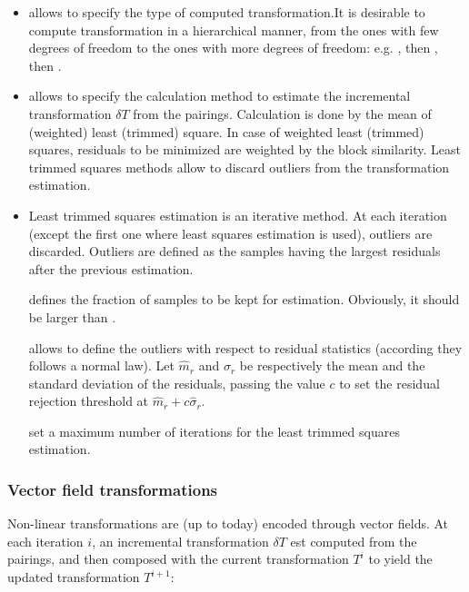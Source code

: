\begin{itemize}

\item[]  allows to specify the type of computed transformation.It is desirable to compute transformation in a hierarchical manner, from the ones with few degrees of freedom to the ones with more degrees of freedom: e.g. , then , then .

\item[]  allows to specify the calculation method to estimate the incremental transformation $\delta T$ from the pairings. Calculation is done by the mean of (weighted) least (trimmed) square. In case of weighted least (trimmed) squares, residuals to be minimized are weighted by the block similarity. Least trimmed squares methods allow to discard outliers from the transformation estimation.

\item[] Least trimmed squares estimation is an iterative method. At each iteration (except the first one where least squares estimation is used), outliers are discarded. Outliers are defined as the samples having the largest residuals after the previous estimation.

 defines the fraction of samples to be kept for estimation. Obviously, it should be larger than .

 allows to define the outliers with respect to residual statistics (according they follows a normal law). Let $\hat{m}_r$ and $\hat{\sigma}_r$ be respectively the mean and the standard deviation of the residuals, passing the value $c$ to  set the residual rejection threshold at $\hat{m}_r + c \hat{\sigma}_r$.

 set a maximum number of iterations for the least trimmed squares estimation.


\end{itemize}



\subsubsection{Vector field transformations}
\label{sec:parameters:vectorfield:estimation}

Non-linear transformations are (up to today) encoded through vector fields. At each iteration $i$, an incremental transformation $\delta T$ est computed from the pairings, and then composed with the current transformation $T^i$ to yield the updated transformation $T^{i+1}$: 



